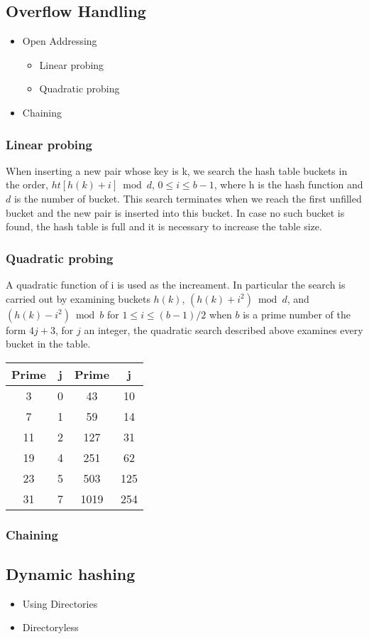 \subsection{Overflow Handling}\label{overflow-handling}

\begin{itemize}
\item
  Open Addressing

  \begin{itemize}
  \item
    Linear probing
  \item
    Quadratic probing
  \end{itemize}
\item
  Chaining
\end{itemize}

\subsubsection{Linear probing}\label{linear-probing}

When inserting a new pair whose key is k, we search the hash table
buckets in the order, $ ht[h(k) + i] \bmod d $, $ 0 \leq i \leq b-1 $,
where h is the hash function and $ d $ is the number of bucket. This
search terminates when we reach the first unfilled bucket and the new
pair is inserted into this bucket. In case no such bucket is found, the
hash table is full and it is necessary to increase the table size.

\subsubsection{Quadratic probing}\label{quadratic-probing}

A quadratic function of i is used as the increament. In particular the
search is carried out by examining buckets $ h(k) $, $ (h(k) + i^2)
\bmod d $, and $ (h(k) - i^2) \bmod b $ for $ 1 \leq i \leq (b-1) / 2 $
when $ b $ is a prime number of the form $ 4j+3 $, for $ j $ an integer,
the quadratic search described above examines every bucket in the table.

\begin{center}
    \begin{tabular} { c c | c c }
        Prime & j & Prime & j \\
        \hline
        3 & 0 & 43 & 10 \\
        7 & 1 & 59 & 14 \\
        11 & 2 & 127 & 31 \\
        19 & 4 & 251 & 62 \\
        23 & 5 & 503 & 125 \\
        31 & 7 & 1019 & 254
    \end{tabular}
\end{center}

\subsubsection{Chaining}\label{chaining}

\subsection{Dynamic hashing}\label{dynamic-hashing}

\begin{itemize}
\item
  Using Directories
\item
  Directoryless
\end{itemize}
